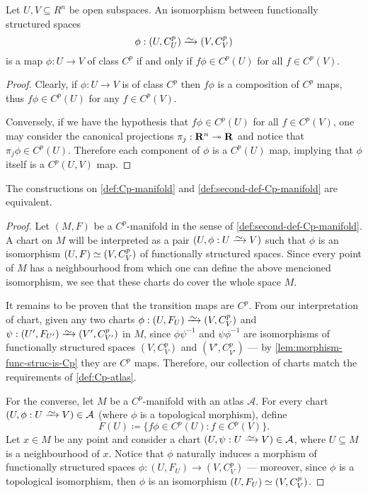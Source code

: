\begin{lemma}
\label{lem:morphism-func-struc-is-Cp}
Let \(U, V \subseteq R^n\) be open subspaces. An isomorphism between
functionally structured spaces
\[
\phi: (U, C_U^p) \isoto (V, C_V^p)
\]
is a map \(\phi: U \to V\) of class \(C^p\) if and only if \(f \phi \in C^p(U)\)
for all \(f \in C^p(V)\).
\end{lemma}

\begin{proof}
Clearly, if \(\phi: U \to V\) is of class \(C^p\) then \(f \phi\) is a
composition of \(C^p\) maps, thus \(f \phi \in C^p(U)\) for any \(f \in
C^p(V)\).

Conversely, if we have the hypothesis that \(f \phi \in C^p(U)\) for all
\(f \in C^p(V)\), one may consider the canonical projections
\(\pi_j: \mathbf{R}^n \twoheadrightarrow \mathbf{R}\) and notice that \(\pi_j \phi \in C^p(U)\). Therefore
each component of \(\phi\) is a \(C^p(U)\) map, implying that \(\phi\) itself is
a \(C^p(U, V)\) map.
\end{proof}

\begin{lemma}
\label{lem:equivalence-def-Cp-man}
The constructions on \cref{def:Cp-manifold} and
\cref{def:second-def-Cp-manifold} are equivalent.
\end{lemma}

\begin{proof}
Let \((M, F)\) be a \(C^p\)-manifold in the sense of
\cref{def:second-def-Cp-manifold}. A chart on \(M\) will be interpreted as a
pair \((U, \phi: U \isoto V)\) such that \(\phi\) is an isomorphism
\((U, F) \simeq (V, C_V^p)\) of functionally structured spaces. Since every point
of \(M\) has a neighbourhood from which one can define the above mencioned
isomorphism, we see that these charts do cover the whole space \(M\).

It remains to be proven that the transition maps are \(C^p\). From our
interpretation of chart, given any two charts
\(\phi: (U, F_U) \isoto (V, C_V^p)\) and
\(\psi: (U', F_{U'}) \isoto (V', C_{V'}^p)\) in \(M\), since \(\phi \psi^{-1}\)
and \(\psi \phi^{-1}\) are isomorphisms of functionally structured spaces
\((V, C_V^p)\) and \((V', C_{V'}^p)\) --- by \cref{lem:morphism-func-struc-is-Cp}
they are \(C^p\) maps. Therefore, our collection of charts match the
requirements of \cref{def:Cp-atlas}.

For the converse, let \(M\) be a \(C^p\)-manifold with an atlas
\(\mathcal{A}\). For every chart \((U, \phi: U \isoto V) \in \mathcal{A}\)
(where \(\phi\) is a topological morphism), define
\[
F(U) \coloneq \{f \phi \in C^{p}(U) \colon f \in C^p(V)\}.
\]
Let \(x \in M\) be any point and consider a chart \((U, \psi: U \isoto V)
\in \mathcal{A}\), where \(U \subseteq M\) is a neighbourhood of \(x\). Notice
that \(\phi\) naturally induces a morphism of functionally structured spaces
\(\phi: (U, F_U) \to (V, C_V^p)\) --- moreover, since \(\phi\) is a topological
isomorphism, then \(\phi\) is an isomorphism \((U, F_U) \simeq (V, C_V^p)\).
\end{proof}

